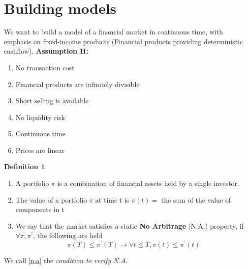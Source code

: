 \documentclass[10pt, oneside, reqno]{amsbook}
\theoremstyle{plain}%
\theoremstyle{definition}
\theoremstyle{rem}
\theoremstyle{definition}
\newtheorem{dfn}[thm]{Definition}
\numberwithin{equation}{chapter}
\begin{document}
\section{Building models} 
We want to build a model of a financial market in continuous time, with emphasis on fixed-income products (Financial
products providing deterministic cashflow). 
\textbf{Assumption H:}
\begin{enumerate}
 \item No transaction cost
\item Financial products are infinitely divisible
\item Short selling is available 
\item No liquidity risk 
\item Continuous time
\item Prices are linear
\end{enumerate}
\begin{dfn}
\begin{enumerate}
 \item A portfolio $\pi$ is a combination of financial assets held by a single investor. 
\item The value of a portfolio $\pi$ at time t is $\pi(t) =$ the sum of the value of components in t
\item We say that the market satisfies a static \textbf{No Arbitrage} (N.A.) property, if $\forall \pi, \pi^{'}$, the
following are held 
\begin{equation}\label{n.a}
 \pi(T) \leq \pi^{'}(T) \to \forall t \leq T, \pi(t) \leq \pi^{'}(t)
\end{equation}

\end{enumerate}

\end{dfn}
We call \ref{n.a} the \textit{condition to verify N.A.} 
\end{document}
